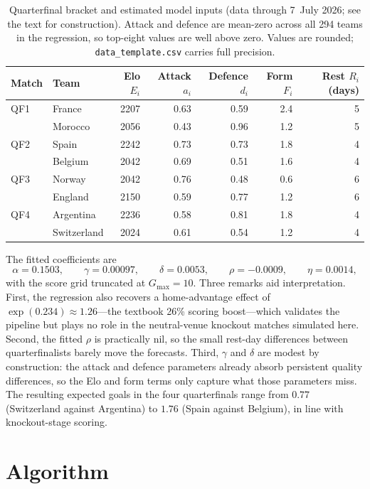 \documentclass[11pt]{article}
\begin{document}
\begin{table}[htbp]
\centering
\caption{Quarterfinal bracket and estimated model inputs (data through
7~July 2026; see the text for construction). Attack and defence are
mean-zero across all 294 teams in the regression, so top-eight values are
well above zero. Values are rounded; \texttt{data\_template.csv} carries
full precision.}
\label{tab:inputs}
\begin{tabular}{llrrrrr}
\toprule
Match & Team & Elo $E_i$ & Attack $a_i$ & Defence $d_i$ & Form $F_i$ & Rest $R_i$ (days)\\
\midrule
QF1 & France      & 2207 & 0.63 & 0.59 & 2.4 & 5\\
    & Morocco     & 2056 & 0.43 & 0.96 & 1.2 & 5\\
\addlinespace
QF2 & Spain       & 2242 & 0.73 & 0.73 & 1.8 & 4\\
    & Belgium     & 2042 & 0.69 & 0.51 & 1.6 & 4\\
\addlinespace
QF3 & Norway      & 2042 & 0.76 & 0.48 & 0.6 & 6\\
    & England     & 2150 & 0.59 & 0.77 & 1.2 & 6\\
\addlinespace
QF4 & Argentina   & 2236 & 0.58 & 0.81 & 1.8 & 4\\
    & Switzerland & 2024 & 0.61 & 0.54 & 1.2 & 4\\
\bottomrule
\end{tabular}
\end{table}

The fitted coefficients are
\[
\alpha = 0.1503,\qquad
\gamma = 0.00097,\qquad
\delta = 0.0053,\qquad
\rho = -0.0009,\qquad
\eta = 0.0014,
\]
with the score grid truncated at $G_{\max} = 10$. Three remarks aid
interpretation. First, the regression also recovers a home-advantage effect
of $\exp(0.234) \approx 1.26$---the textbook 26\% scoring boost---which
validates the pipeline but plays no role in the neutral-venue knockout
matches simulated here. Second, the fitted $\rho$ is practically nil, so the
small rest-day differences between quarterfinalists barely move the
forecasts. Third, $\gamma$ and $\delta$ are modest by construction: the
attack and defence parameters already absorb persistent quality differences,
so the Elo and form terms only capture what those parameters miss. The
resulting expected goals in the four quarterfinals range from $0.77$
(Switzerland against Argentina) to $1.76$ (Spain against Belgium), in line
with knockout-stage scoring.

\section{Algorithm}
\label{sec:algorithm}
\end{document}
